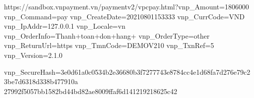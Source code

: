 https://sandbox.vnpayment.vn/paymentv2/vpcpay.html?vnp_Amount=1806000
      vnp_Command=pay
        vnp_CreateDate=20210801153333
           vnp_CurrCode=VND
            vnp_IpAddr=127.0.0.1
                vnp_Locale=vn
                    vnp_OrderInfo=Thanh+toan+don+hang+%
                        vnp_OrderType=other
                          vnp_ReturnUrl=https%
                           vnp_TmnCode=DEMOV210
                               vnp_TxnRef=5
                                  vnp_Version=2.1.0

  vnp_SecureHash=3e0d61a0c0534b2e36680b3f7277743e8784cc4e1d68fa7d276e79c23be7d6318d338b477910a
 27992f5057bb1582bd44bd82ae8009ffaf6d141219218625c42
